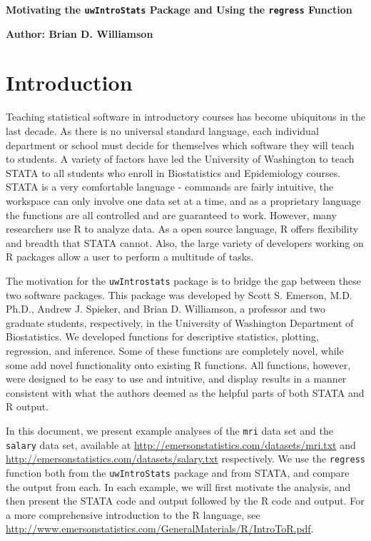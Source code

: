 \documentclass[11pt,letterpaper,fleqn]{report}
\begin{document}
\centerline{\textbf{\Large{Motivating the \texttt{uwIntroStats} Package and Using the \texttt{regress} Function}}}
\centerline{\textbf{Author: Brian D. Williamson}}
\tableofcontents

\chapter{Introduction}
Teaching statistical software in introductory courses has become ubiquitous in the last decade. As there is no universal standard language, each individual department or school must decide for themselves which software they will teach to students. A variety of factors have led the University of Washington to teach STATA to all students who enroll in Biostatistics and Epidemiology courses. STATA is a very comfortable language - commands are fairly intuitive, the workspace can only involve one data set at a time, and as a proprietary language the functions are all controlled and are guaranteed to work. However, many researchers use R to analyze data. As a open source language, R offers flexibility and breadth that STATA cannot. Also, the large variety of developers working on R packages allow a user to perform a multitude of tasks. 

The motivation for the \texttt{uwIntrostats} package is to bridge the gap between these two software packages. This package was developed by Scott S. Emerson, M.D. Ph.D., Andrew J. Spieker, and Brian D. Williamson, a professor and two graduate students, respectively, in the University of Washington Department of Biostatistics. We developed functions for descriptive statistics, plotting, regression, and inference. Some of these functions are completely novel, while some add novel functionality onto existing R functions. All functions, however, were designed to be easy to use and intuitive, and display results in a manner consistent with what the authors deemed as the helpful parts of both STATA and R output. 

In this document, we present example analyses of the \texttt{mri} data set and the \texttt{salary} data set, available at \url{http://emersonstatistics.com/datasets/mri.txt} and \url{http://emersonstatistics.com/datasets/salary.txt} respectively. We use the \texttt{regress} function both from the \texttt{uwIntroStats} package and from STATA, and compare the output from each. In each example, we will first motivate the analysis, and then present the STATA code and output followed by the R code and output. For a more comprehensive introduction to the R language, see \url{http://www.emersonstatistics.com/GeneralMaterials/R/IntroToR.pdf}.
\end{document}
